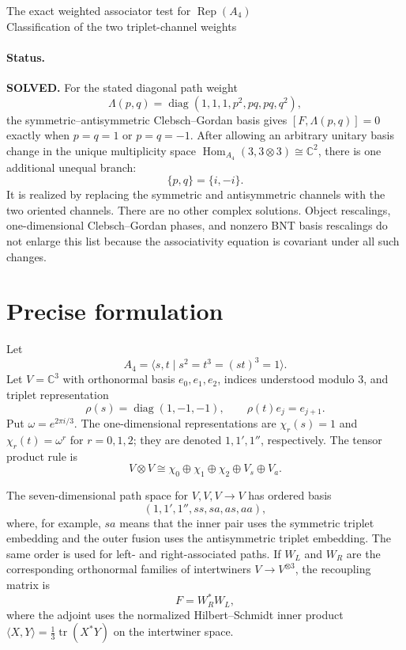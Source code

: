 \documentclass{article}
\newcommand{\C}{\mathbb C}
\newcommand{\Hom}{\operatorname{Hom}}
\newcommand{\diag}{\operatorname{diag}}
\begin{document}
\begin{center}
{\Large The exact weighted associator test for $\operatorname{Rep}(A_4)$}\\
{\large Classification of the two triplet-channel weights}
\end{center}

\paragraph{Status.}
\textbf{SOLVED.}  For the stated diagonal path weight
\[
\Lambda(p,q)=\diag(1,1,1,p^2,pq,pq,q^2),
\]
the symmetric--antisymmetric Clebsch--Gordan basis gives
$[F,\Lambda(p,q)]=0$ exactly when $p=q=1$ or $p=q=-1$.
After allowing an arbitrary unitary basis change in the unique multiplicity
space $\Hom_{A_4}(3,3\otimes3)\cong\C^2$, there is one additional unequal
branch:
\[
\{p,q\}=\{i,-i\}.
\]
It is realized by replacing the symmetric and antisymmetric channels with the
two oriented channels. There are no other complex solutions. Object
rescalings, one-dimensional Clebsch--Gordan phases, and nonzero BNT basis
rescalings do not enlarge this list because the associativity equation is
covariant under all such changes.

\section{Precise formulation}

Let
\[
A_4=\langle s,t\mid s^2=t^3=(st)^3=1\rangle.
\]
Let $V=\C^3$ with orthonormal basis $e_0,e_1,e_2$, indices understood modulo
$3$, and triplet representation
\[
\rho(s)=\diag(1,-1,-1),
\qquad
\rho(t)e_j=e_{j+1}.
\]
Put $\omega=e^{2\pi i/3}$. The one-dimensional representations are
$\chi_r(s)=1$ and $\chi_r(t)=\omega^r$ for $r=0,1,2$; they are denoted
$1,1',1''$, respectively. The tensor product rule is
\[
V\otimes V\cong \chi_0\oplus\chi_1\oplus\chi_2\oplus V_s\oplus V_a.
\]

The seven-dimensional path space for $V,V,V\to V$ has ordered basis
\[
(1,1',1'',ss,sa,as,aa),
\]
where, for example, $sa$ means that the inner pair uses the symmetric triplet
embedding and the outer fusion uses the antisymmetric triplet embedding.
The same order is used for left- and right-associated paths. If $W_L$ and
$W_R$ are the corresponding orthonormal families of intertwiners
$V\to V^{\otimes3}$, the recoupling matrix is
\[
F=W_R^*W_L,
\]
where the adjoint uses the normalized Hilbert--Schmidt inner product
$\langle X,Y\rangle=\frac13\operatorname{tr}(X^*Y)$ on the intertwiner space.
\end{document}
